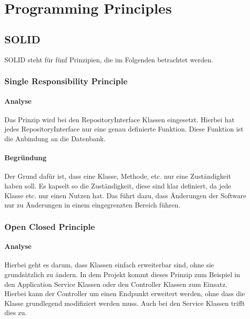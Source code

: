 
\chapter{Programming Principles}

\section{SOLID}
SOLID steht für fünf Prinzipien, die im Folgenden betrachtet werden.

    \subsection{Single Responsibility Principle}
    
        \subsubsection{Analyse}
        Das Prinzip wird bei den RepositoryInterface Klassen eingesetzt. Hierbei hat jedes RepositoryInterface nur eine genau definierte Funktion. Diese Funktion ist die Anbindung an die Datenbank.
        
        \subsubsection{Begründung}
        Der Grund dafür ist, dass eine Klasse, Methode, etc. nur eine Zuständigkeit haben soll. Es kapselt so die Zuständigkeit, diese sind klar definiert, da jede Klasse etc. nur einen Nutzen hat. Das führt dazu, dass Änderungen der Software nur zu Änderungen in einem eingegrenzten Bereich führen.

    \subsection{Open Closed Principle}
    
        \subsubsection{Analyse}
        Hierbei geht es darum, dass Klassen einfach erweiterbar sind, ohne sie grundsätzlich zu ändern. In dem Projekt kommt dieses Prinzip zum Beispiel in den Application Service Klassen oder den Controller Klassen zum Einsatz. Hierbei kann der Controller um einen Endpunkt erweitert werden, ohne dass die Klasse grundlegend modifiziert werden muss. Auch bei den Service Klassen trifft dies zu.
        

